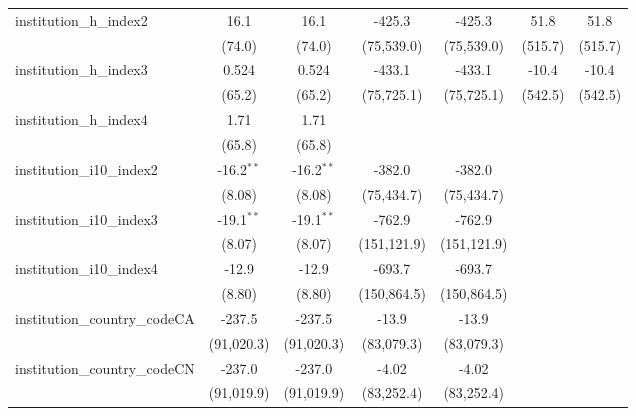 \begin{tabular}{lcccccc}
   institution\_h\_index2                & 16.1         & 16.1         & -425.3      & -425.3      & 51.8          & 51.8\\   
                                         & (74.0)       & (74.0)       & (75,539.0)  & (75,539.0)  & (515.7)       & (515.7)\\   
   institution\_h\_index3                & 0.524        & 0.524        & -433.1      & -433.1      & -10.4         & -10.4\\   
                                         & (65.2)       & (65.2)       & (75,725.1)  & (75,725.1)  & (542.5)       & (542.5)\\   
   institution\_h\_index4                & 1.71         & 1.71         &             &             &               &   \\   
                                         & (65.8)       & (65.8)       &             &             &               &   \\   
   institution\_i10\_index2              & -16.2$^{**}$ & -16.2$^{**}$ & -382.0      & -382.0      &               &   \\   
                                         & (8.08)       & (8.08)       & (75,434.7)  & (75,434.7)  &               &   \\   
   institution\_i10\_index3              & -19.1$^{**}$ & -19.1$^{**}$ & -762.9      & -762.9      &               &   \\   
                                         & (8.07)       & (8.07)       & (151,121.9) & (151,121.9) &               &   \\   
   institution\_i10\_index4              & -12.9        & -12.9        & -693.7      & -693.7      &               &   \\   
                                         & (8.80)       & (8.80)       & (150,864.5) & (150,864.5) &               &   \\   
   institution\_country\_codeCA          & -237.5       & -237.5       & -13.9       & -13.9       &               &   \\   
                                         & (91,020.3)   & (91,020.3)   & (83,079.3)  & (83,079.3)  &               &   \\   
   institution\_country\_codeCN          & -237.0       & -237.0       & -4.02       & -4.02       &               &   \\   
                                         & (91,019.9)   & (91,019.9)   & (83,252.4)  & (83,252.4)  &               &   \\   

\end{tabular}
